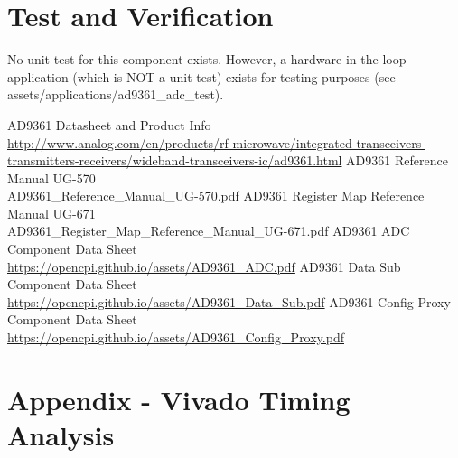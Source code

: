 \documentclass{article}
\begin{document}
\pagebreak
\section*{Test and Verification}
No unit test for this component exists. However, a hardware-in-the-loop
application (which is NOT a unit test) exists for testing purposes (see
assets/applications/ad9361\_adc\_test).

 \begin{thebibliography}{1}

 AD9361 Datasheet and Product Info \\
\url{http://www.analog.com/en/products/rf-microwave/integrated-transceivers-transmitters-receivers/wideband-transceivers-ic/ad9361.html}
  AD9361 Reference Manual UG-570\\
 AD9361\_Reference\_Manual\_UG-570.pdf
  AD9361 Register Map Reference Manual UG-671\\
 AD9361\_Register\_Map\_Reference\_Manual\_UG-671.pdf
  AD9361 ADC Component Data Sheet \\
 \url{https://opencpi.github.io/assets/AD9361_ADC.pdf}
  AD9361 Data Sub Component Data Sheet \\
 \url{https://opencpi.github.io/assets/AD9361_Data_Sub.pdf}
  AD9361 Config Proxy Component Data Sheet \\
 \url{https://opencpi.github.io/assets/AD9361_Config_Proxy.pdf}

 \end{thebibliography}

\pagebreak
\section{Appendix - Vivado Timing Analysis} \label{appendix}
\end{document}
